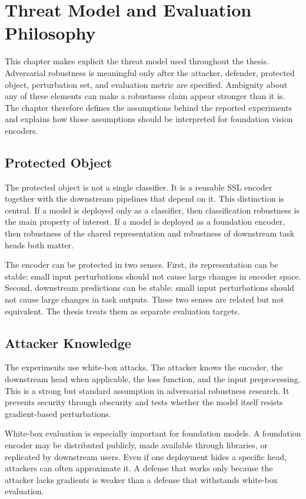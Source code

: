 \chapter{Threat Model and Evaluation Philosophy}
\label{chap:threat-model}

This chapter makes explicit the threat model used throughout the thesis. Adversarial robustness is meaningful only after the attacker, defender, protected object, perturbation set, and evaluation metric are specified. Ambiguity about any of these elements can make a robustness claim appear stronger than it is. The chapter therefore defines the assumptions behind the reported experiments and explains how those assumptions should be interpreted for foundation vision encoders.

\section{Protected Object}

The protected object is not a single classifier. It is a reusable SSL encoder together with the downstream pipelines that depend on it. This distinction is central. If a model is deployed only as a classifier, then classification robustness is the main property of interest. If a model is deployed as a foundation encoder, then robustness of the shared representation and robustness of downstream task heads both matter.

The encoder can be protected in two senses. First, its representation can be stable: small input perturbations should not cause large changes in encoder space. Second, downstream predictions can be stable: small input perturbations should not cause large changes in task outputs. These two senses are related but not equivalent. The thesis treats them as separate evaluation targets.

\section{Attacker Knowledge}

The experiments use white-box attacks. The attacker knows the encoder, the downstream head when applicable, the loss function, and the input preprocessing. This is a strong but standard assumption in adversarial robustness research. It prevents security through obscurity and tests whether the model itself resists gradient-based perturbations.

White-box evaluation is especially important for foundation models. A foundation encoder may be distributed publicly, made available through libraries, or replicated by downstream users. Even if one deployment hides a specific head, attackers can often approximate it. A defense that works only because the attacker lacks gradients is weaker than a defense that withstands white-box evaluation.

